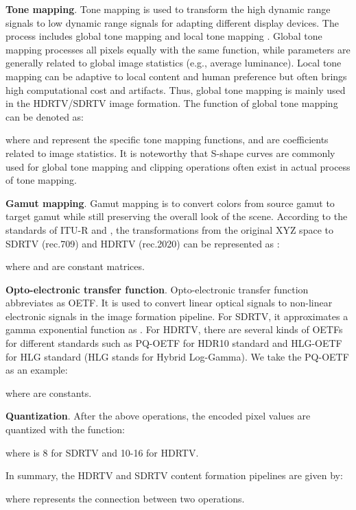 \documentclass[10pt,twocolumn,letterpaper]{article}
\begin{document}
\textbf{Tone mapping}. Tone mapping is used to transform the high dynamic range signals to low dynamic range signals for adapting different display devices. The process includes global tone mapping \cite{drago2003adaptive, reinhard2002parameter, tumblin1993tone} and local tone mapping \cite{larson1997visibility, lischinski2006interactive}. Global tone mapping processes all pixels equally with the same function, while parameters are generally related to global image statistics (e.g., average luminance). Local tone mapping can be adaptive to local content and human preference but often brings high computational cost and artifacts. Thus, global tone mapping is mainly used in the HDRTV/SDRTV image formation. The function of global tone mapping can be denoted as:

where  and  represent the specific tone mapping functions,  and  are coefficients related to image statistics. It is noteworthy that S-shape curves are commonly used for global tone mapping and clipping operations often exist in actual process of tone mapping.

\textbf{Gamut mapping}. Gamut mapping is to convert colors from source gamut to target gamut while still preserving the overall look of the scene. According to the standards of ITU-R \cite{rec709} and \cite{rec2020}, the transformations from the original XYZ space to SDRTV (rec.709) and HDRTV (rec.2020) can be represented as :

where  and  are  constant matrices. 

\textbf{Opto-electronic transfer function}. Opto-electronic transfer function abbreviates as OETF. It is used to convert linear optical signals to non-linear electronic signals in the image formation pipeline. For SDRTV, it approximates a gamma exponential function as . For HDRTV, there are several kinds of OETFs for different standards such as PQ-OETF \cite{PQ} for HDR10 standard and HLG-OETF \cite{bt2100} for HLG standard (HLG stands for Hybrid Log-Gamma). We take the PQ-OETF as an example:

where  are constants. 

\textbf{Quantization}. After the above operations, the encoded pixel values are quantized with the function:

where  is 8 for SDRTV and 10-16 for HDRTV.

In summary, the HDRTV and SDRTV content formation pipelines are given by:


where  represents the connection between two operations. 
\end{document}
